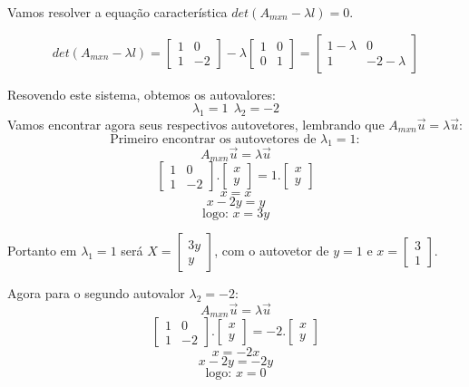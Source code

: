 \documentclass[
]{book}
\begin{document}
Vamos resolver a equação característica \(det(A_{mxn}-\lambda l)=0\).

\[det(A_{mxn}-\lambda l)=\begin{bmatrix}
1 &0 \\ 
1 &-2 
\end{bmatrix} - \lambda \begin{bmatrix}
1 &0 \\ 
0 &1 
\end{bmatrix} = \begin{bmatrix}
1-\lambda &0 \\ 
1 &-2-\lambda 
\end{bmatrix}\]

Resovendo este sistema, obtemos os autovalores:
\[\lambda_1=1 \ \ \lambda_2=-2\]
Vamos encontrar agora seus respectivos autovetores, lembrando que \(A_{mxn}\vec{u}=\lambda \vec{u}\):
\[ \mbox{Primeiro encontrar os autovetores de }\lambda_1=1:\]
\[A_{mxn}\vec{u}=\lambda \vec{u}\]
\[\begin{bmatrix}
1 &0 \\ 
1 &-2 
\end{bmatrix}. \begin{bmatrix}
x \\ 
y  
\end{bmatrix}=1.\begin{bmatrix}
x \\ 
y  
\end{bmatrix} \]
\[x=x \]
\[x-2y=y \]
\[\mbox{logo: } x=3y\]

Portanto em \(\lambda_1=1\) será \(X=\begin{bmatrix}3y\\y\end{bmatrix}\), com o autovetor de \(y=1\) e \(x=\begin{bmatrix}3\\1\end{bmatrix}\).

Agora para o segundo autovalor \(\lambda_2=-2\):
\[A_{mxn}\vec{u}=\lambda \vec{u} \]
\[\begin{bmatrix}
1 &0 \\ 
1 &-2 
\end{bmatrix}. \begin{bmatrix}
x \\ 
y  
\end{bmatrix}=-2.\begin{bmatrix}
x \\ 
y  
\end{bmatrix} \]
\[x=-2x\]
\[x-2y=-2y \]
\[ \mbox{logo: } x=0\]
\end{document}
